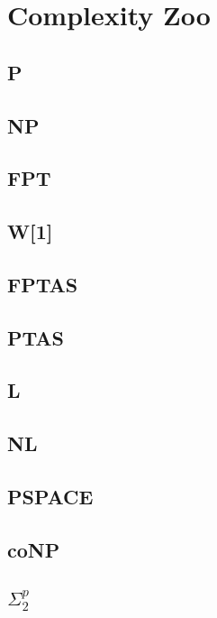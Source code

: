 \documentclass[]{article}
\begin{document}
\section{Complexity Zoo}

\subsection{P}

\subsection{NP}

\subsection{FPT}

\subsection{W[1]}

\subsection{FPTAS}

\subsection{PTAS}

\subsection{L}

\subsection{NL}

\subsection{PSPACE}

\subsection{coNP}

\subsection{$\Sigma^p_2$}
\end{document}
